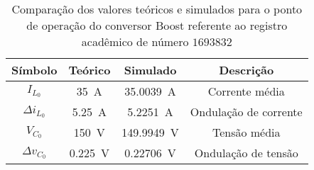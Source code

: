 \begin{table}[!ht]
\centering
\caption{Comparação dos valores teóricos e simulados para o ponto de operação do conversor Boost referente ao registro acadêmico de número $1693832$}
\label{tab:steadystatesim}
\begin{tabular}{@{}cccc@{}}
\toprule
\textbf{Símbolo} & \textbf{Teórico} & \textbf{Simulado} & \textbf{Descrição}\\ \midrule
$I_{L_0}$ & \SI{35}{\A} & \SI{35.0039}{\A} & Corrente média\\
$\Delta{i_{L_0}}$  & \SI{5.25}{\A} & \SI{5.2251}{\A}& Ondulação de corrente\\
$V_{C_0}$ & \SI{150}{\V} & \SI{149.9949}{\V} & Tensão média\\
$\Delta{v_{C_0}}$  & \SI{0.225}{\V} & \SI{0.22706}{\V}& Ondulação de tensão \\
\bottomrule
\end{tabular}
\end{table}

